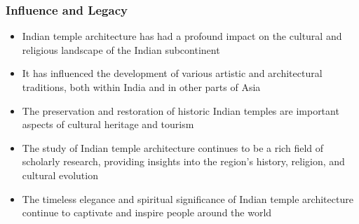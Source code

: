 \begin{frame}[fragile]\frametitle{Influence and Legacy}
    \begin{itemize}
        \item Indian temple architecture has had a profound impact on the cultural and religious landscape of the Indian subcontinent
        \item It has influenced the development of various artistic and architectural traditions, both within India and in other parts of Asia
        \item The preservation and restoration of historic Indian temples are important aspects of cultural heritage and tourism
        \item The study of Indian temple architecture continues to be a rich field of scholarly research, providing insights into the region's history, religion, and cultural evolution
        \item The timeless elegance and spiritual significance of Indian temple architecture continue to captivate and inspire people around the world
    \end{itemize}
\end{frame}
